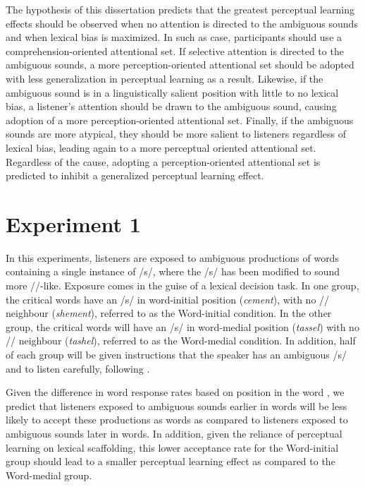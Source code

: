 The hypothesis of this dissertation predicts that the greatest perceptual learning effects should be observed when no attention is directed to the ambiguous sounds and when lexical bias is maximized.  
In such as case, participants should use a comprehension-oriented attentional set.  
If selective attention is directed to the ambiguous sounds, a more perception-oriented attentional set should be adopted with less generalization in perceptual learning as a result. 
Likewise, if the ambiguous sound is in a linguistically salient position with little to no lexical bias, a listener's attention should be drawn to the ambiguous sound, causing adoption of a more perception-oriented attentional set.  
Finally, if the ambiguous sounds are more atypical, they should be more salient to listeners regardless of lexical bias, leading again to a more perceptual oriented attentional set.  
Regardless of the cause, adopting a perception-oriented attentional set is predicted to inhibit a generalized perceptual learning effect.

\section{Experiment 1}

In this experiments, listeners are exposed to ambiguous productions of words containing a single instance of /s/, where the /s/ has been modified to sound more /\textesh/-like.
Exposure comes in the guise of a lexical decision task. 
In one group, the critical words have an /s/ in word-initial position (\emph{cement}), with no /\textesh/ neighbour (\emph{shement}), referred to as the Word-initial condition.  
In the other group, the critical words will have an /s/ in word-medial position (\emph{tassel}) with no /\textesh/ neighbour (\emph{tashel}), referred to as the Word-medial condition.  
In addition, half of each group will be given instructions that the speaker has an ambiguous /s/ and to listen carefully, following \citet{Pitt2012}.

Given the difference in word response rates based on position in the word \citep{Pitt2012}, we predict that listeners exposed to ambiguous sounds earlier in words will be less likely to accept these productions as words as compared to listeners exposed to ambiguous sounds later in words.  
In addition, given the reliance of perceptual learning on lexical scaffolding, this lower acceptance rate for the Word-initial group should lead to a smaller perceptual learning effect as compared to the Word-medial group.

